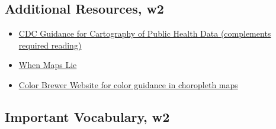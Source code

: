 \documentclass[
]{book}
\providecommand{\tightlist}{%
  \setlength{\itemsep}{0pt}\setlength{\parskip}{0pt}}
\begin{document}
\hypertarget{additional-resources-w2}{%
\subsection{Additional Resources, w2}\label{additional-resources-w2}}

\begin{itemize}
\tightlist
\item
  \href{https://www.cdc.gov/dhdsp/maps/gisx/resources/tips-creating-ph-maps.html}{CDC Guidance for Cartography of Public Health Data (complements required reading)}
\item
  \href{https://www.citylab.com/design/2015/06/when-maps-lie/396761/}{When Maps Lie}
\item
  \href{http://colorbrewer2.org/\#}{Color Brewer Website for color guidance in choropleth maps}
\end{itemize}

\hypertarget{important-vocabulary-w2}{%
\subsection{Important Vocabulary, w2}\label{important-vocabulary-w2}}

 
  \providecommand{\huxb}[2]{\arrayrulecolor[RGB]{#1}\global\arrayrulewidth=#2pt}
  \providecommand{\huxvb}[2]{\color[RGB]{#1}\vrule width #2pt}
  \providecommand{\huxtpad}[1]{\rule{0pt}{#1}}
  \providecommand{\huxbpad}[1]{\rule[-#1]{0pt}{#1}}
\end{document}
